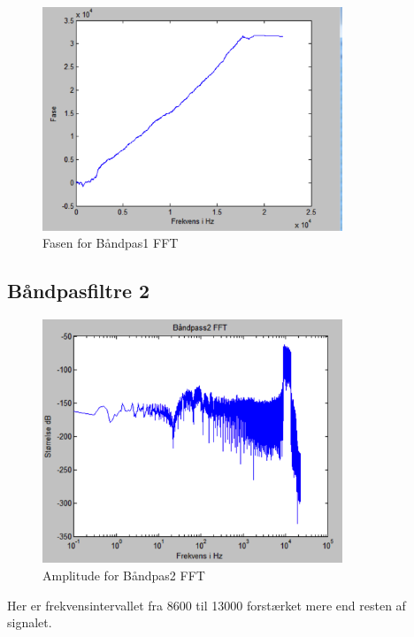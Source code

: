 \begin{figure}[H]
	\centering
	\includegraphics[width=0.8\textwidth]{Figur/Snip20151111_77}
	\caption{Fasen for Båndpas1 FFT}
\end{figure}

\subsection{Båndpasfiltre 2}

\begin{figure}[H]
	\centering
	\includegraphics[width=0.8\textwidth]{Figur/Snip20151111_78}
	\caption{Amplitude for Båndpas2 FFT}
\end{figure}

Her er frekvensintervallet fra 8600 til 13000 forstærket mere end resten af signalet. 

